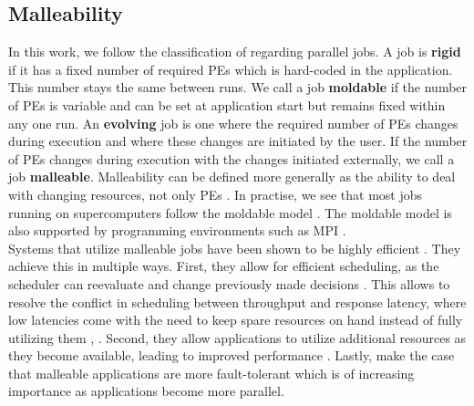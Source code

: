 \subsection{Malleability}
\label{prelim: malleability}
In this work, we follow the classification of \cite{feitelson1997job} regarding parallel jobs. A job is \textbf{rigid} if it has a fixed number of required PEs which is hard-coded in the application. This number stays the same between runs. We call a job \textbf{moldable} if the number of PEs is variable and can be set at application start but remains fixed within any one run. An \textbf{evolving} job is one where the required number of PEs changes during execution and where these changes are initiated by the user. If the number of PEs changes during execution with the changes initiated externally, we call a job \textbf{malleable}.
Malleability can be defined more generally as the ability to deal with changing resources, not only PEs \cite{sonmez2007scheduling}. In practise, we see that most jobs running on supercomputers follow the moldable model \cite{cirne2001model}. The moldable model is also supported by programming environments such as MPI \cite{hungershofer2004combined}. \\
Systems that utilize malleable jobs have been shown to be highly efficient \cite{feitelson1997job}.
They achieve this in multiple ways.
First, they allow for efficient scheduling, as the scheduler can reevaluate and change previously made decisions \cite{sonmez2007scheduling}. This allows to resolve the conflict in scheduling between throughput and response latency, where low latencies come with the need to keep spare resources on hand instead of fully utilizing them \cite{feitelson1997job}, \cite{hungershofer2004combined}.
Second, they allow applications to utilize additional resources as they become available, leading to improved performance \cite{hungershofer2004combined}. Lastly, \cite{buisson2005framework} make the case that malleable applications are more fault-tolerant which is of increasing importance as applications become more parallel. \\
